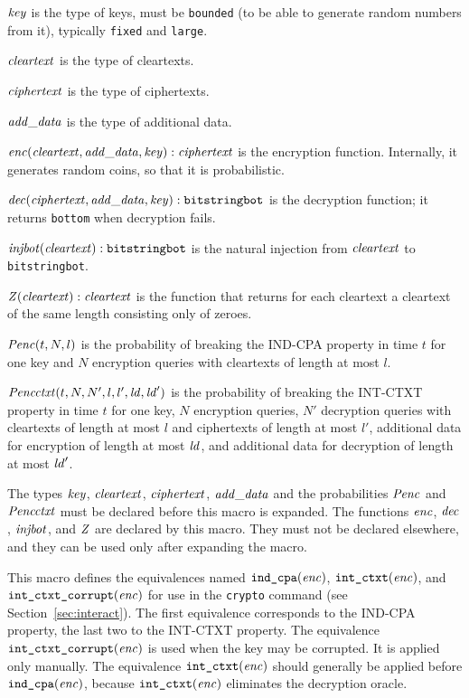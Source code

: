\documentclass{article}
\begin{document}
\begin{itemize}
   $\mathit{key}$ is the type of keys, must be \texttt{bounded} (to be able to generate random numbers from it), typically \texttt{fixed} and \texttt{large}.

   $\mathit{cleartext}$ is the type of cleartexts.

   $\mathit{ciphertext}$ is the type of ciphertexts.

   $\mathit{add\_data}$ is the type of additional data.

   $\mathit{enc}(\mathit{cleartext}, \mathit{add\_data}, \mathit{key}): \mathit{ciphertext}$ is the encryption function. Internally, it generates random coins, so that it is probabilistic.

   $\mathit{dec}(\mathit{ciphertext}, \mathit{add\_data}, \mathit{key}): \texttt{bitstringbot}$ is the
  decryption function; it returns \texttt{bottom} when decryption
  fails.

   $\mathit{injbot}(\mathit{cleartext}): \texttt{bitstringbot}$ is the natural
  injection from $\mathit{cleartext}$ to \texttt{bitstringbot}.

   $\mathit{Z}(\mathit{cleartext}): \mathit{cleartext}$ is the function that
  returns for each cleartext a cleartext of the same length consisting
  only of zeroes.

  $\mathit{Penc}(t, N, l)$ is the probability of breaking the IND-CPA
  property in time $t$ for one key and $N$ encryption queries with
  cleartexts of length at most $l$.

  $\mathit{Pencctxt}(t, N, N', l, l', \mathit{ld}, \mathit{ld}')$ is the probability of
  breaking the INT-CTXT property in time $t$ for one key, $N$
  encryption queries, $N'$ decryption queries with cleartexts of
  length at most $l$ and ciphertexts of length at most $l'$,
  additional data for encryption of length at most $\mathit{ld}$, and
  additional data for decryption of length at most $\mathit{ld}'$.

   The types $\mathit{key}$, $\mathit{cleartext}$,
   $\mathit{ciphertext}$, $\mathit{add\_data}$ and the probabilities $\mathit{Penc}$ and $\mathit{Pencctxt}$ must
   be declared before this macro is expanded. The functions
   $\mathit{enc}$, $\mathit{dec}$, $\mathit{injbot}$, and $\mathit{Z}$ are declared by this
   macro. They must not be declared elsewhere, and they can be used
   only after expanding the macro.

   This macro defines the equivalences named $\texttt{ind\_cpa}(\mathit{enc})$,
   $\texttt{int\_ctxt}(\mathit{enc})$, and $\texttt{int\_ctxt\_corrupt}(\mathit{enc})$ 
   for use in the \texttt{crypto} command 
   (see Section~\ref{sec:interact}). 
   The first equivalence corresponds to the
   IND-CPA property, the last two to the INT-CTXT property.
   The equivalence $\texttt{int\_ctxt\_corrupt}(\mathit{enc})$ is used when the
   key may be corrupted. It is applied only manually.
   The equivalence $\texttt{int\_ctxt}(\mathit{enc})$
   should generally be applied before $\texttt{ind\_cpa}(\mathit{enc})$,
   because $\texttt{int\_ctxt}(\mathit{enc})$ eliminates the decryption oracle.


\end{itemize}
\end{document}
